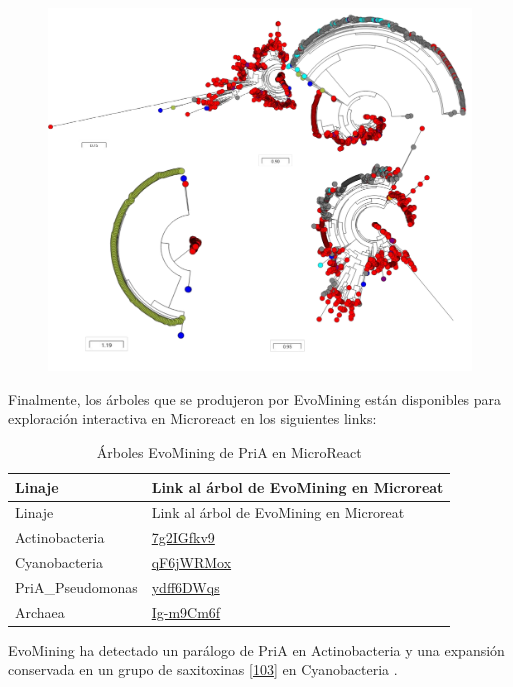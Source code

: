 \documentclass[12pt,twoside]{reedthesis}
\begin{document}
  \begin{figure}[h!tbp]
  \centering
  \includegraphics[angle = 0,scale = 0.8]{chapter4/PriAEvoMining.pdf}
  \caption[Árboles de destino metabólico de PriA en Actinobacteria, Cyanobacteria, Pseudomonas y Archaea según EvoMining]{\footnotesize{}}
  \label{fig:PriAExpansions}
  \end{figure}
  
  Finalmente, los árboles que se produjeron por EvoMining están
  disponibles para exploración interactiva en Microreact en los siguientes
  links:
  
  \begin{longtable}[]{@{}ll@{}}
  \caption{Árboles EvoMining de PriA en MicroReact
  \label{tab:arboles}}\tabularnewline
  \toprule
  Linaje & Link al árbol de EvoMining en Microreat\tabularnewline
  \midrule
  \endfirsthead
  \toprule
  Linaje & Link al árbol de EvoMining en Microreat\tabularnewline
  \midrule
  \endhead
  Actinobacteria &
  \href{https://microreact.org/project/7g2IGfkv9}{7g2IGfkv9}\tabularnewline
  Cyanobacteria &
  \href{https://microreact.org/project/qF6jWRMox}{qF6jWRMox}\tabularnewline
  PriA\_Pseudomonas &
  \href{https://microreact.org/project/ydff6DWqs}{ydff6DWqs}\tabularnewline
  Archaea &
  \href{https://microreact.org/project/Ig-m9Cm6f}{Ig-m9Cm6f}\tabularnewline
  \bottomrule
  \end{longtable}
  
  EvoMining ha detectado un parálogo de PriA en Actinobacteria y una
  expansión conservada en un grupo de saxitoxinas
  {[}\protect\hyperlink{ref-moustafa_origin_2009}{103}{]} en Cyanobacteria
  .
  
\end{document}
